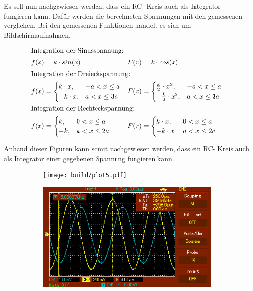 Es soll nun nachgewiesen werden, dass ein RC- Kreis auch als Integrator fungieren kann.
Dafür werden die berechneten Spannungen mit den gemessenen verglichen.
Bei den gemessenen Funktionen handelt es sich um Bildschirmaufnahmen.

\begin{align*}
  \shortintertext{Integration der Sinusspannung:}
  f(x) &= k \cdot sin(x) & F(x) &= k \cdot cos(x) \\
  \shortintertext{Integration der Dreieckspannung:}
  f(x) &=
  \begin{cases}
    k \cdot x, & -a < x \leq a \\
    -k \cdot x, & a < x \leq 3a
  \end{cases}
  & F(x) &=
  \begin{cases}
    \frac{k}{2} \cdot x^2, & -a < x \leq a \\
    -\frac{k}{2} \cdot x^2, & a < x \leq 3a
  \end{cases} \\
  \shortintertext{Integration der Rechteckspannung:}
  f(x) &=
  \begin{cases}
    k, & 0 < x \leq a \\
    -k, & a < x \leq 2a
  \end{cases}
  & F(x) &=
  \begin{cases}
    k \cdot x, & 0 < x \leq a \\
    -k \cdot x, & a < x \leq 2a
  \end{cases}
\end{align*}

Anhand dieser Figuren kann somit nachgewiesen werden, dass ein RC- Kreis auch als Integrator einer gegebenen Spannung fungieren kann.

\begin{figure}
  \centering
  \begin{subfigure}{0.48\textwidth}
    \centering
    \texttt{[image: build/plot5.pdf]}
    \label{fig:sinplt}
  \end{subfigure}
  \begin{subfigure}{0.48\textwidth}
    \centering
    \includegraphics[width=\textwidth]{integration/MAP001.png}
    \label{fig:singms}
  \end{subfigure} \end{figure}

